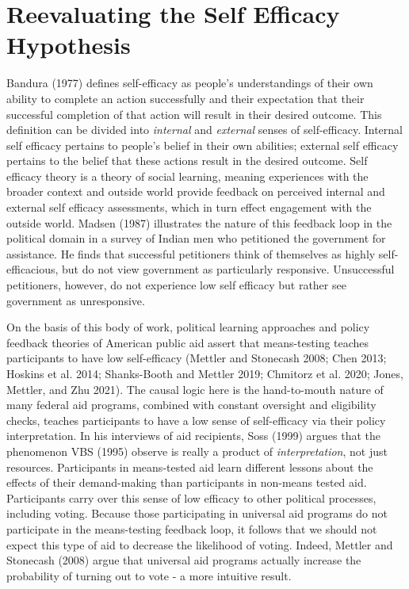 \documentclass[12pt]{paper}
\begin{document}
\section{Reevaluating the Self Efficacy Hypothesis}
Bandura (1977) defines self-efficacy as people’s understandings of their own ability to complete an action successfully and their expectation that their successful completion of that action will result in their desired outcome. This definition can be divided into \textit{internal} and \textit{external} senses of self-efficacy. Internal self efficacy pertains to people's belief in their own abilities; external self efficacy pertains to the belief that these actions result in the desired outcome. Self efficacy theory is a theory of social learning, meaning experiences with the broader context and outside world provide feedback on perceived internal and external self efficacy assessments, which in turn effect engagement with the outside world. Madsen (1987) illustrates the nature of this feedback loop in the political domain in a survey of Indian men who petitioned the government for assistance. He finds that successful petitioners think of themselves as highly self-efficacious, but do not view government as particularly responsive. Unsuccessful petitioners, however, do not experience low self efficacy but rather see government as unresponsive.

On the basis of this body of work, political learning approaches and policy feedback theories of American public aid assert that means-testing teaches participants to have low self-efficacy (Mettler and Stonecash 2008; Chen 2013; Hoskins et al. 2014; Shanks-Booth and Mettler 2019; Chmitorz et al. 2020; Jones, Mettler, and Zhu 2021). The causal logic here is the hand-to-mouth nature of many federal aid programs, combined with constant oversight and eligibility checks, teaches participants to have a low sense of self-efficacy via their policy interpretation. In his interviews of aid recipients, Soss (1999) argues that the phenomenon VBS (1995) observe is really a product of \textit{interpretation}, not just resources. Participants in means-tested aid learn different lessons about the effects of their demand-making than participants in non-means tested aid. Participants carry over this sense of low efficacy to other political processes, including voting. Because those participating in universal aid programs do not participate in the means-testing feedback loop, it follows that we should not expect this type of aid to decrease the likelihood of voting. Indeed, Mettler and Stonecash (2008) argue that universal aid programs actually increase the probability of turning out to vote - a more intuitive result.
\end{document}
